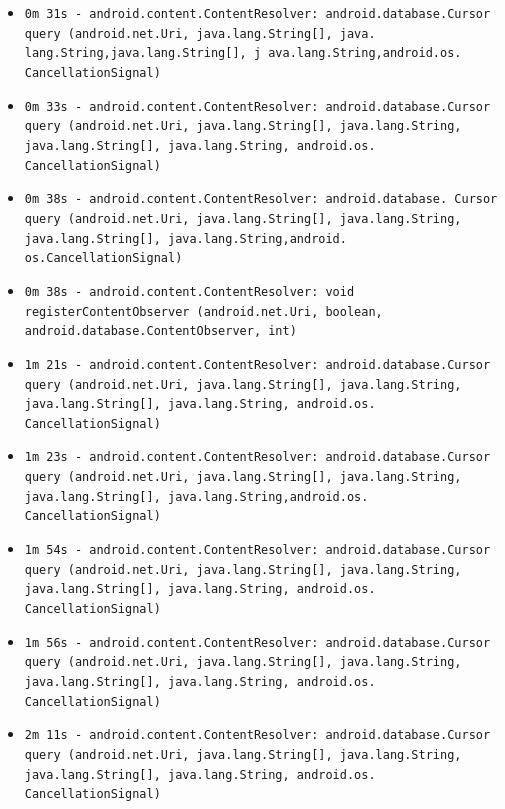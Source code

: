 \begin{itemize}
 \item  \texttt{0m 31s  -  android.content.ContentResolver: android.database.Cursor query  (android.net.Uri, java.lang.String[], java. lang.String,java.lang.String[], j ava.lang.String,android.os. CancellationSignal)}
  \item \texttt{0m 33s  -  android.content.ContentResolver: android.database.Cursor query (android.net.Uri, java.lang.String[], java.lang.String, java.lang.String[], java.lang.String, android.os. CancellationSignal)}
 \item  \texttt{0m 38s  -  android.content.ContentResolver: android.database. Cursor query (android.net.Uri, java.lang.String[], java.lang.String, java.lang.String[],  java.lang.String,android. os.CancellationSignal)}
\item   \texttt{0m 38s  -  android.content.ContentResolver: void registerContentObserver (android.net.Uri, boolean, android.database.ContentObserver, int)}
 \item  \texttt{1m 21s  -  android.content.ContentResolver: android.database.Cursor query (android.net.Uri, java.lang.String[], java.lang.String, java.lang.String[], java.lang.String, android.os. CancellationSignal)}
 \item  \texttt{1m 23s  -  android.content.ContentResolver: android.database.Cursor query (android.net.Uri, java.lang.String[], java.lang.String, java.lang.String[], java.lang.String,android.os. CancellationSignal)}
 \item  \texttt{1m 54s  -  android.content.ContentResolver: android.database.Cursor query (android.net.Uri, java.lang.String[], java.lang.String, java.lang.String[], java.lang.String, android.os. CancellationSignal)}
 \item  \texttt{1m 56s  -  android.content.ContentResolver: android.database.Cursor query (android.net.Uri, java.lang.String[], java.lang.String, java.lang.String[], java.lang.String, android.os. CancellationSignal)}
 \item  \texttt{2m 11s   -  android.content.ContentResolver: android.database.Cursor query (android.net.Uri, java.lang.String[], java.lang.String, java.lang.String[],  java.lang.String, android.os. CancellationSignal)}

\end{itemize}

